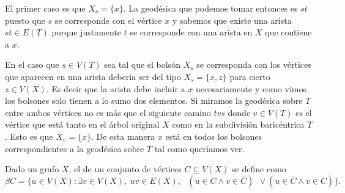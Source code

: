 \documentclass[tesis.tex]{subfiles}
\begin{document}
\begin{obs}
\begin{enumerate}
	El primer caso es que $X_s = \{ x \}$.
	La geodésica que podemos tomar entonces es $st$ puesto que $s$ se corresponde con el vértice $x$ y sabemos que existe una arista $st \in E(T)$ porque justamente $t$ se corresponde con una arista en $X$ que contiene a $x$.
	
	En el caso que $s \in V(T)$ sea tal que el bolsón $X_s$ se corresponda con los vértices que aparecen en una arista debería ser del tipo $X_s = \{x,z\}$ para cierto $z \in V(X)$. 
	Es decir que la arista debe incluir a $x$ necesariamente y como vimos los bolsones solo tienen a lo sumo dos elementos.
	Si miramos la geodésica sobre $T$ entre ambos vértices no es más que el siguiente camino $tvs$ donde $v \in V(T)$ es el vértice que está tanto en el árbol original $X$ como en la subdivisión baricéntrica $T$.
	Esto es que $X_v = \{ x \}$.
	De esta manera $x$ está en todos los bolsones correspondientes a la geodésica sobre $T$ tal como queríamos ver.	
\end{enumerate}
\end{obs}


\begin{comment} [Creo que está bastante mal esto. Si lo tengo que usar más en adelante repensarlo bien.]
	\begin{obs}
	Si un grafo $\Gamma$ tiene treewidth finito podemos tomarnos otra descomposición tal que siga siendo de treewidth finito pero los bolsones de la descomposición sean conexos. 
	Si algún bolsón no es conexo agregamos todos los vértices del grafo que estén en la geodésica que une las componentes conexas. 
	Haciendo esto la descomposición sigue siendo finita aunque el tamaño de los bolsones puede aumentar considerablemente.
	\end{obs}
\end{comment}

\begin{deff}
	Dado un grafo $X$, el  de un conjunto de vértices $C \subseteq V(X)$ se define como
	\[
	\beta C = \{ u \in V(X) : \exists v \in V(X), \ uv \in E(X), \  \ \ (u \in C \wedge v \in \overline C) \ \ \lor  (u \in \overline C \wedge v \in  C)   \}.
	\] 
\end{deff}
\end{document}

